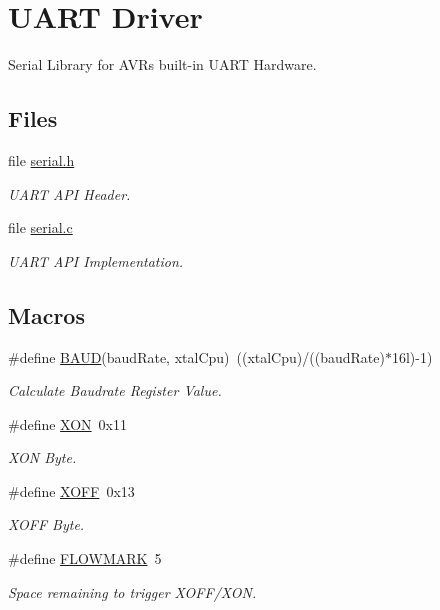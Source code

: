 \hypertarget{group__uart}{\section{U\-A\-R\-T Driver}
\label{group__uart}
}


Serial Library for A\-V\-Rs built-\/in U\-A\-R\-T Hardware.  


\subsection*{Files}
\begin{DoxyCompactItemize}
\item 
file \hyperlink{serial_8h}{serial.\-h}
\begin{DoxyCompactList}\small\item\em U\-A\-R\-T A\-P\-I Header. \end{DoxyCompactList}\item 
file \hyperlink{serial_8c}{serial.\-c}
\begin{DoxyCompactList}\small\item\em U\-A\-R\-T A\-P\-I Implementation. \end{DoxyCompactList}\end{DoxyCompactItemize}
\subsection*{Macros}
\begin{DoxyCompactItemize}
\item 
\#define \hyperlink{group__uart_gafccfd7d1315f0763ac404c6104883341}{B\-A\-U\-D}(baud\-Rate, xtal\-Cpu)~((xtal\-Cpu)/((baud\-Rate)$\ast$16l)-\/1)
\begin{DoxyCompactList}\small\item\em Calculate Baudrate Register Value. \end{DoxyCompactList}\item 
\#define \hyperlink{group__uart_gacdf721774c51e08c6609e6fa8cf82cc9}{X\-O\-N}~0x11
\begin{DoxyCompactList}\small\item\em X\-O\-N Byte. \end{DoxyCompactList}\item 
\#define \hyperlink{group__uart_ga67fd78ae15d2b67c10d44d69a49ab1c5}{X\-O\-F\-F}~0x13
\begin{DoxyCompactList}\small\item\em X\-O\-F\-F Byte. \end{DoxyCompactList}\item 
\#define \hyperlink{group__uart_gaa7907a070ef8e6d68d7d774b34eebe66}{F\-L\-O\-W\-M\-A\-R\-K}~5
\begin{DoxyCompactList}\small\item\em Space remaining to trigger X\-O\-F\-F/\-X\-O\-N. \end{DoxyCompactList}\end{DoxyCompactItemize}
